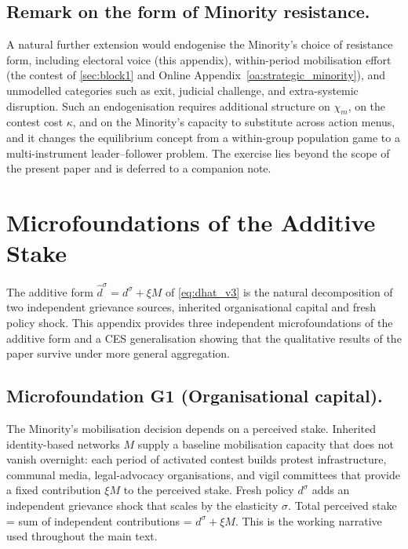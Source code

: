 \documentclass[11pt,twoside]{extarticle}
\begin{document}
\subsection*{Remark on the form of Minority resistance.} A natural further extension would endogenise the Minority's choice of resistance form, including electoral voice (this appendix), within-period mobilisation effort (the contest of \autoref{sec:block1} and Online Appendix~\ref{oa:strategic_minority}), and unmodelled categories such as exit, judicial challenge, and extra-systemic disruption. Such an endogenisation requires additional structure on $\chi_m$, on the contest cost $\kappa$, and on the Minority's capacity to substitute across action menus, and it changes the equilibrium concept from a within-group population game to a multi-instrument leader--follower problem. The exercise lies beyond the scope of the present paper and is deferred to a companion note.


\section{Microfoundations of the Additive Stake}\label{oa:stake_micro}

The additive form $\hat d^\sigma=d^\sigma+\xi M$ of \autoref{eq:dhat_v3} is the natural decomposition of two independent grievance sources, inherited organisational capital and fresh policy shock. This appendix provides three independent microfoundations of the additive form and a CES generalisation showing that the qualitative results of the paper survive under more general aggregation.

\subsection*{Microfoundation G1 (Organisational capital).} The Minority's mobilisation decision depends on a perceived stake. Inherited identity-based networks $M$ supply a baseline mobilisation capacity that does not vanish overnight: each period of activated contest builds protest infrastructure, communal media, legal-advocacy organisations, and vigil committees that provide a fixed contribution $\xi M$ to the perceived stake. Fresh policy $d^\sigma$ adds an independent grievance shock that scales by the elasticity $\sigma$. Total perceived stake = sum of independent contributions = $d^\sigma+\xi M$. This is the working narrative used throughout the main text.
\end{document}
